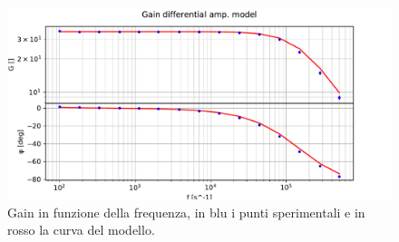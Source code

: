 \begin{figure}[h]
	\centering
    \includegraphics[width=\textwidth]{Figure_6.pdf}
    
    \caption{Gain in funzione della frequenza, in blu i punti sperimentali e in rosso la curva del modello.}
    \label{fig:gain_model}
\end{figure}
 
 